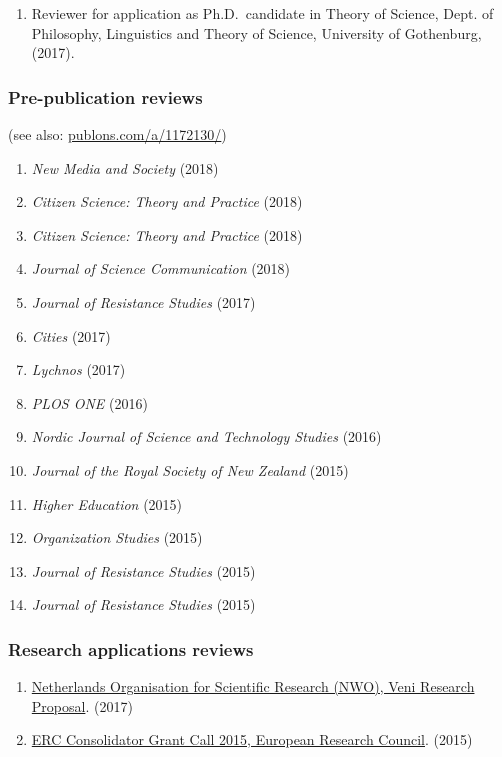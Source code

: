 \documentclass[
]{article}
\providecommand{\tightlist}{%
  \setlength{\itemsep}{0pt}\setlength{\parskip}{0pt}}
\begin{document}
\begin{enumerate}
\def\labelenumi{\arabic{enumi}.}
\tightlist
\item
  Reviewer for application as Ph.D.~candidate in Theory of Science,
  Dept. of Philosophy, Linguistics and Theory of Science, University of
  Gothenburg, (2017).
\end{enumerate}

\hypertarget{pre-publication-reviews}{%
\subsubsection{Pre-publication reviews}\label{pre-publication-reviews}}

(see also: \url{publons.com/a/1172130/})

\begin{enumerate}
\def\labelenumi{\arabic{enumi}.}
\tightlist
\item
  \emph{New Media and Society} (2018)
\item
  \emph{Citizen Science: Theory and Practice} (2018)
\item
  \emph{Citizen Science: Theory and Practice} (2018)
\item
  \emph{Journal of Science Communication} (2018)
\item
  \emph{Journal of Resistance Studies} (2017)
\item
  \emph{Cities} (2017)
\item
  \emph{Lychnos} (2017)
\item
  \emph{PLOS ONE} (2016)
\item
  \emph{Nordic Journal of Science and Technology Studies} (2016)
\item
  \emph{Journal of the Royal Society of New Zealand} (2015)
\item
  \emph{Higher Education} (2015)
\item
  \emph{Organization Studies} (2015)
\item
  \emph{Journal of Resistance Studies} (2015)
\item
  \emph{Journal of Resistance Studies} (2015)
\end{enumerate}

\hypertarget{research-applications-reviews}{%
\subsubsection{Research applications
reviews}\label{research-applications-reviews}}

\begin{enumerate}
\def\labelenumi{\arabic{enumi}.}
\tightlist
\item
  \href{http://files.christopherkullenberg.se/NWOreview.pdf}{Netherlands
  Organisation for Scientific Research (NWO), Veni Research Proposal}.
  (2017)
\item
  \href{http://files.christopherkullenberg.se/erc.pdf}{ERC Consolidator
  Grant Call 2015, European Research Council}. (2015)
\end{enumerate}
\end{document}

